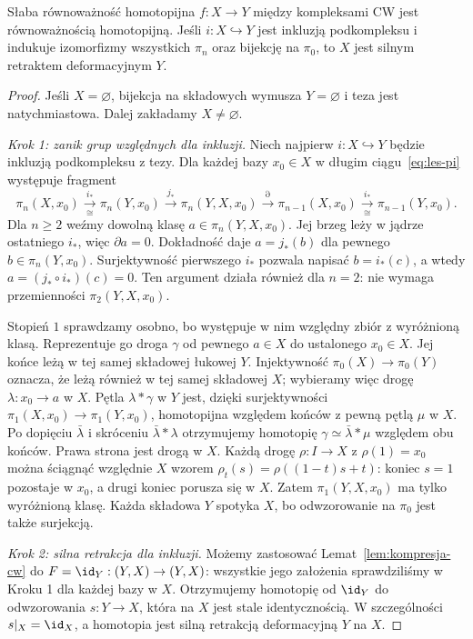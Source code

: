 \begin{twierdzenie}[Whitehead]
\label{thm:whitehead}
Słaba równoważność homotopijna $f:X\to Y$ między kompleksami CW
jest równoważnością homotopijną. Jeśli $i:X\hookrightarrow Y$
jest inkluzją podkompleksu i indukuje izomorfizmy wszystkich
$\pi_n$ oraz bijekcję na $\pi_0$, to $X$ jest silnym retraktem
deformacyjnym $Y$.
\end{twierdzenie}
\begin{proof}
Jeśli $X=\varnothing$, bijekcja na składowych wymusza
$Y=\varnothing$ i teza jest natychmiastowa.
Dalej zakładamy $X\ne\varnothing$.

\emph{Krok 1: zanik grup względnych dla inkluzji.}
Niech najpierw $i:X\hookrightarrow Y$ będzie inkluzją
podkompleksu z tezy. Dla każdej bazy $x_0\in X$
w długim ciągu~\eqref{eq:les-pi} występuje fragment
\[
 \pi_n(X,x_0)\xrightarrow[\cong]{i_*}\pi_n(Y,x_0)
 \xrightarrow{j_*}\pi_n(Y,X,x_0)
 \xrightarrow{\partial}\pi_{n-1}(X,x_0)
 \xrightarrow[\cong]{i_*}\pi_{n-1}(Y,x_0).
\]
Dla $n\geq2$ weźmy dowolną klasę $a\in\pi_n(Y,X,x_0)$.
Jej brzeg leży w jądrze ostatniego $i_*$, więc $\partial a=0$.
Dokładność daje $a=j_*(b)$ dla pewnego $b\in\pi_n(Y,x_0)$.
Surjektywność pierwszego $i_*$ pozwala napisać $b=i_*(c)$,
a wtedy $a=(j_*\circ i_*)(c)=0$.
Ten argument działa również dla $n=2$: nie wymaga przemienności
$\pi_2(Y,X,x_0)$.

Stopień $1$ sprawdzamy osobno, bo występuje w nim względny
zbiór z wyróżnioną klasą. Reprezentuje go droga $\gamma$
od pewnego $a\in X$ do ustalonego $x_0\in X$.
Jej końce leżą w tej samej składowej łukowej $Y$.
Injektywność $\pi_0(X)\to\pi_0(Y)$ oznacza, że leżą również
w tej samej składowej $X$; wybieramy więc drogę
$\lambda:x_0\to a$ w $X$.
Pętla $\lambda*\gamma$ w $Y$ jest, dzięki surjektywności
$\pi_1(X,x_0)\to\pi_1(Y,x_0)$, homotopijna względem końców
z pewną pętlą $\mu$ w $X$.
Po dopięciu $\bar\lambda$ i skróceniu $\bar\lambda*\lambda$
otrzymujemy homotopię $\gamma\simeq\bar\lambda*\mu$
względem obu końców. Prawa strona jest drogą w $X$.
Każdą drogę $\rho:I\to X$ z $\rho(1)=x_0$ można ściągnąć
względnie $X$ wzorem $\rho_t(s)=\rho((1-t)s+t)$:
koniec $s=1$ pozostaje w $x_0$, a drugi koniec porusza się w $X$.
Zatem $\pi_1(Y,X,x_0)$ ma tylko wyróżnioną klasę.
Każda składowa $Y$ spotyka $X$, bo odwzorowanie na $\pi_0$
jest także surjekcją.

\emph{Krok 2: silna retrakcja dla inkluzji.}
Możemy zastosować Lemat~\ref{lem:kompresja-cw} do
$F=\id_Y:(Y,X)\to(Y,X)$: wszystkie jego założenia
sprawdziliśmy w Kroku 1 dla każdej bazy w $X$.
Otrzymujemy homotopię od $\id_Y$ do odwzorowania $s:Y\to X$,
która na $X$ jest stale identycznością.
W szczególności $s|_X=\id_X$, a homotopia jest
silną retrakcją deformacyjną $Y$ na $X$.


\end{proof}
